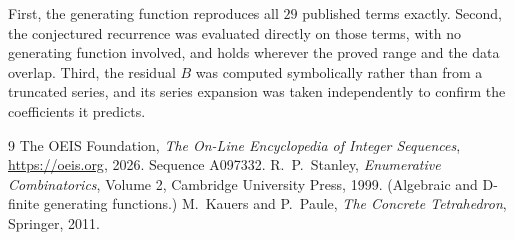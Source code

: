 \documentclass[11pt,a4paper]{article}
\theoremstyle{plain}
\theoremstyle{definition}
\begin{document}
First, the generating function reproduces all $29$ published terms exactly. Second,
the conjectured recurrence was evaluated directly on those terms, with no generating function
involved, and holds wherever the proved range and the data overlap. Third, the residual $B$ was
computed symbolically rather than from a truncated series, and its series expansion was taken
independently to confirm the coefficients it predicts.

\begin{thebibliography}{9}
 The OEIS Foundation, \emph{The On-Line Encyclopedia of Integer Sequences},
\url{https://oeis.org}, 2026. Sequence A097332.
 R.~P.~Stanley, \emph{Enumerative Combinatorics}, Volume 2, Cambridge
University Press, 1999. (Algebraic and D-finite generating functions.)
 M.~Kauers and P.~Paule, \emph{The Concrete Tetrahedron}, Springer, 2011.
\end{thebibliography}
\end{document}
